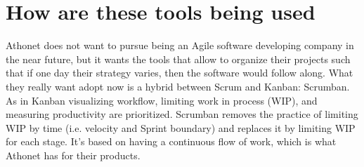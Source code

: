 \section{How are these tools being used}
	
	
	Athonet does not want to pursue being an Agile software developing company in the near future, but it wants the tools that allow to organize their projects such that if one day their strategy varies, then the software would follow along.
	What they really want adopt now is a hybrid between Scrum and Kanban: Scrumban.\\	
	As in Kanban visualizing workflow, limiting work in process (WIP), and measuring productivity are prioritized.	
	Scrumban removes the practice of limiting WIP by time (i.e. velocity and Sprint boundary) and replaces it by limiting WIP for each stage.
	It's based on having a continuous flow of work, which is what Athonet has for their products.\\	
	